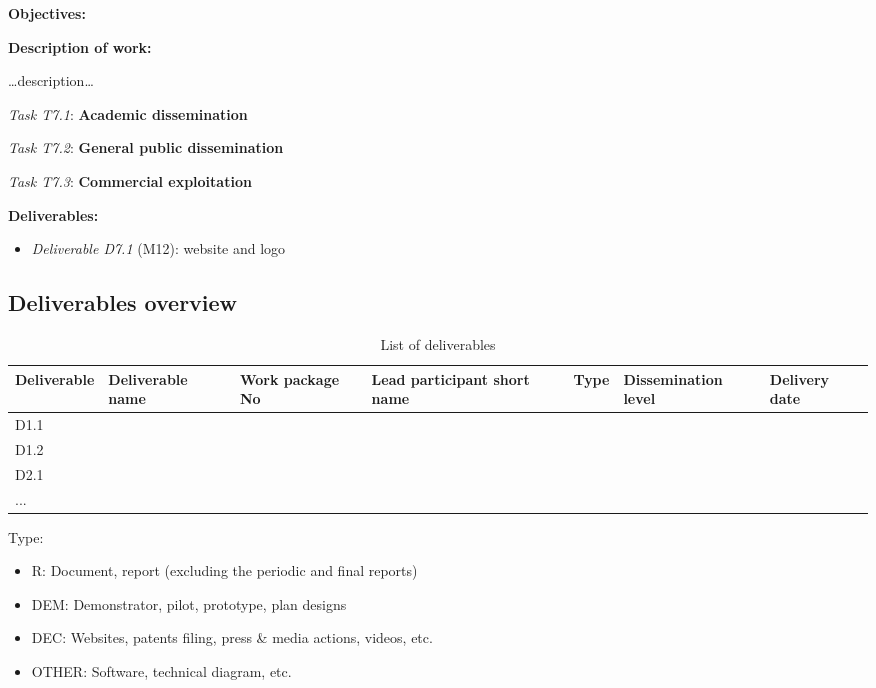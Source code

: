 \documentclass[11pt]{report}
\newcommand{\task}[2]{\vspace{0.5cm}\noindent\emph{Task T#1}: {\bf #2}\par}
\newcommand{\D}[3]{\emph{Deliverable D#1} (M#2): #3\\}
\begin{document}
\textbf{Objectives:}

\textbf{Description of work:}

\ldots{}description\ldots{}

\task{7.1}{Academic dissemination}
\task{7.2}{General public dissemination}
\task{7.3}{Commercial exploitation}

\vspace{0.5cm}\textbf{Deliverables:}

\begin{itemize}
    \item \D{7.1}{12}{website and logo}
\end{itemize}


\subsection{Deliverables overview}\label{deliverables-overview}

\begin{table}[!htbp]
\caption{List of deliverables}
\begin{tabular}{@{}lllllll@{}}
\toprule
\textbf{Deliverable} & \textbf{Deliverable name} & \textbf{Work package No} & \textbf{Lead participant short name} & \textbf{Type} & \textbf{Dissemination level} & \textbf{Delivery date} \\ \midrule
D1.1                 &                           &                          &                                      &               &                              &                        \\
D1.2                 &                           &                          &                                      &               &                              &                        \\
D2.1                 &                           &                          &                                      &               &                              &                        \\
...                  &                           &                          &                                      &               &                              &                        \\ \bottomrule
\end{tabular}
\end{table}

Type:

\begin{itemize}

\item   R: Document, report (excluding the periodic and final reports)
\item   DEM: Demonstrator, pilot, prototype, plan designs
\item   DEC: Websites, patents filing, press \& media actions, videos, etc.
\item   OTHER: Software, technical diagram, etc.
\end{itemize}
\end{document}
